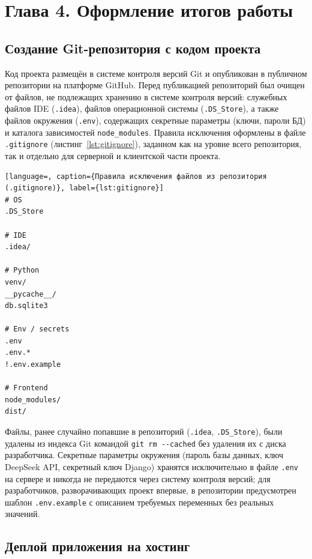 \section*{Глава 4. Оформление итогов работы}

\subsection{Создание Git-репозитория с кодом проекта}

Код проекта размещён в системе контроля версий Git и опубликован в
публичном репозитории на платформе GitHub. Перед публикацией
репозиторий был очищен от файлов, не подлежащих хранению в системе
контроля версий: служебных файлов IDE (\texttt{.idea}), файлов
операционной системы (\texttt{.DS\_Store}), а также файлов окружения
(\texttt{.env}), содержащих секретные параметры (ключи, пароли БД) и
каталога зависимостей \texttt{node\_modules}. Правила исключения
оформлены в файле \texttt{.gitignore} (листинг~\ref{lst:gitignore}),
заданном как на уровне всего репозитория, так и отдельно для
серверной и клиентской части проекта.

\begin{lstlisting}[language=, caption={Правила исключения файлов из репозитория (.gitignore)}, label={lst:gitignore}]
# OS
.DS_Store

# IDE
.idea/

# Python
venv/
__pycache__/
db.sqlite3

# Env / secrets
.env
.env.*
!.env.example

# Frontend
node_modules/
dist/
\end{lstlisting}

Файлы, ранее случайно попавшие в репозиторий (\texttt{.idea},
\texttt{.DS\_Store}), были удалены из индекса Git командой
\texttt{git rm -{}-cached} без удаления их с диска разработчика.
Секретные параметры окружения (пароль базы данных, ключ DeepSeek API,
секретный ключ Django) хранятся исключительно в файле \texttt{.env} на
сервере и никогда не передаются через систему контроля версий; для
разработчиков, разворачивающих проект впервые, в репозитории
предусмотрен шаблон \texttt{.env.example} с описанием требуемых
переменных без реальных значений.

\subsection{Деплой приложения на хостинг}

